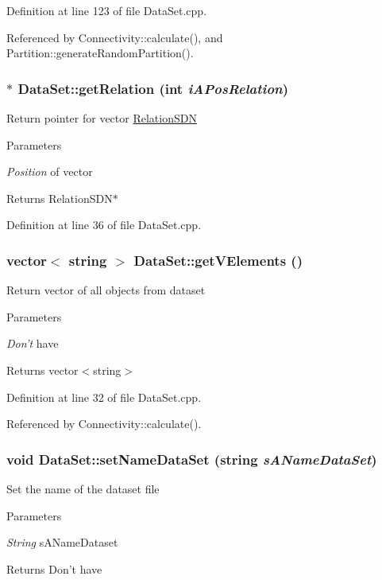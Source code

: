 Definition at line 123 of file DataSet.cpp.

Referenced by Connectivity::calculate(), and Partition::generateRandomPartition().\hypertarget{classDataSet_a0f0dc6d4ebc1b45cce29c2bc3bbc0a75}{
\subsubsection[{getRelation}]{ $\ast$ DataSet::getRelation (int {\em iAPosRelation})}}
\label{classDataSet_a0f0dc6d4ebc1b45cce29c2bc3bbc0a75}
Return pointer for vector \hyperlink{classRelationSDN}{RelationSDN} 
\begin{DoxyParams}{Parameters}
\item[{\em Position}]of vector \end{DoxyParams}
\begin{DoxyReturn}{Returns}
RelationSDN$\ast$ 
\end{DoxyReturn}


Definition at line 36 of file DataSet.cpp.\hypertarget{classDataSet_aaa850e86d8c43a4209cc83cf5354822f}{
\subsubsection[{getVElements}]{\setlength{\rightskip}{0pt plus 5cm}vector$<$ string $>$ DataSet::getVElements ()}}
\label{classDataSet_aaa850e86d8c43a4209cc83cf5354822f}
Return vector of all objects from dataset 
\begin{DoxyParams}{Parameters}
\item[{\em Don't}]have \end{DoxyParams}
\begin{DoxyReturn}{Returns}
vector$<$string$>$ 
\end{DoxyReturn}


Definition at line 32 of file DataSet.cpp.

Referenced by Connectivity::calculate().\hypertarget{classDataSet_a13b30783d97d4ea7469988979afe457f}{
\subsubsection[{setNameDataSet}]{\setlength{\rightskip}{0pt plus 5cm}void DataSet::setNameDataSet (string {\em sANameDataSet})}}
\label{classDataSet_a13b30783d97d4ea7469988979afe457f}
Set the name of the dataset file 
\begin{DoxyParams}{Parameters}
\item[{\em String}]sANameDataset \end{DoxyParams}
\begin{DoxyReturn}{Returns}
Don't have 
\end{DoxyReturn}


